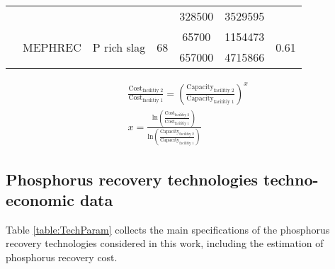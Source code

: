 \documentclass[authoryear]{elsarticle}
\begin{document}
\begin{table}[h]
{\begin{tabular}{@{}ccccccc@{}}
			&         &            &                                                                                     & 328500                                                         & 3529595                                                     &                                    \\
			& \multirow{2}{*}{MEPHREC}           & \multirow{2}{*}{P rich slag}                & \multirow{2}{*}{68}                                                                                    & 65700                                                          & 1154473                                                     & \multirow{2}{*}{0.61} \\
			&            &                &                                                                                     & 657000                                                         & 4715866                                                     &                                    \\ \bottomrule
		\end{tabular}
	}
\end{table}
\begin{align}
	& \frac{\text{Cost}_{\text{facilitiy 2}}}{\text{Cost}_{\text{facilitiy 1}}} = \left( \frac{\text{Capacity}_{\text{facilitiy 2}}}{\text{Capacity}_{\text{facilitiy 1}}} \right)^x \label{eq:CostoToCapacity1}\\
	& x = \frac{\text{ln} \left(\frac{\text{Cost}_{\text{facilitiy 2}}}{\text{Cost}_{\text{facilitiy 1}}} \right) }{\text{ln} \left( \frac{\text{Capacity}_{\text{facilitiy 2}}}{\text{Capacity}_{\text{facilitiy 1}}}\right) } \label{eq:CostoToCapacityLinearization}
\end{align}


\subsection{Phosphorus recovery technologies techno-economic data}

Table \ref{table:TechParam} collects the main specifications of the phosphorus recovery technologies considered in this work, including the estimation of phosphorus recovery cost.
\end{document}
